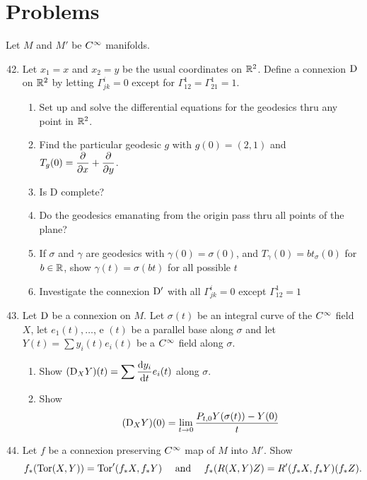 \documentclass[../main]{subfiles}
\begin{document}
\section*{Problems}
Let $M$ and $M'$ be $C^\infty$ manifolds.
\begin{enumerate}
    \setcounter{enumi}{41}
    \item\label{pro:42} Let $x_1=x$ and $x_2=y$ be the usual coordinates on $\mathbb{R}^2$. Define a connexion $\mathrm{D}$ on $\mathbb{R}^2$ by letting $\Gamma_{jk}^i=0$ except for $\Gamma_{12}^1 = \Gamma_{21}^1=1$. 
    \begin{enumerate}[label = (\roman*)]
        \item Set up and solve the differential equations for the geodesics thru any point in $\mathbb{R}^2$.
        \item Find the particular geodesic $g$ with $g(0)=(2,1)$ and $T_g(0) = \dfrac{\partial }{\partial x}+\dfrac{\partial }{\partial y}$.
        \item Is D complete?
        \item Do the geodesics emanating from the origin pass thru all points of the plane?
        \item If $\sigma$ and $\gamma$ are geodesics with $\gamma(0)=\sigma(0)$, and $T_\gamma(0)=bt_\sigma(0)$ for $b\in \mathbb{R}$, show $\gamma(t)= \sigma(bt)$ for all possible $t$
        \item Investigate the connexion $\mathrm{D}'$ with all $\Gamma_{jk}^i=0$ except $\Gamma_{12}^1=1$
    \end{enumerate} 


    \item\label{pro:43}Let $\mathrm{D}$ be a connexion on $M$. Let $\sigma(t)$ be an integral curve of the $C^\infty$ field $X$, let $e_{1}(t), \ldots$, e $(t)$ be a parallel base along $\sigma$ and let $Y(t)=\sum y_{i}(t) e_{i}(t)$ be a $C^\infty$ field along $\sigma$. 
    \begin{enumerate}[label = (\roman*)]
        \item Show $(\mathrm{D}_{X} Y)(t)=\displaystyle \sum \dfrac{\mathrm{d}y_i}{\mathrm{d}t} e_i(t)$ along $\sigma$.
        \item Show \[(\mathrm{D}_{X} Y)(0)=\lim_{t\to 0}\dfrac{P_{t,0} Y(\sigma(t))-Y(0)}{t}\]
    \end{enumerate} 
    
    \item\label{pro:44} Let $f$ be a connexion preserving $C^\infty$ map of $M$ into $M'$. Show \[f_*(\mathrm{Tor}(X, Y))=\mathrm{Tor}'(f_*X,f_*Y)\quad \text{ and } \quad f_*(R(X,Y)Z)=R'(f_*X,f_*Y)(f_*Z).\]


\end{enumerate}
\end{document}
